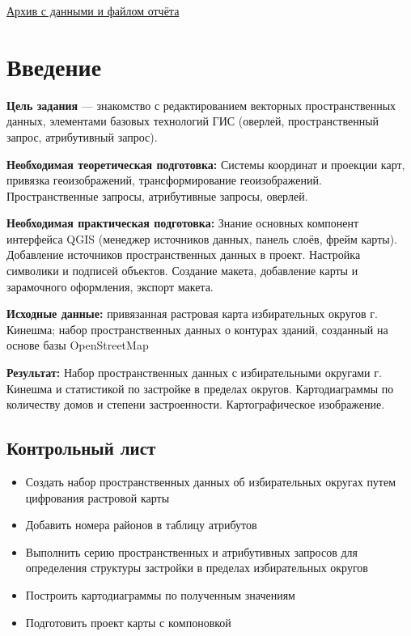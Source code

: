 \documentclass[
  12pt,
]{book}
\providecommand{\tightlist}{%
  \setlength{\itemsep}{0pt}\setlength{\parskip}{0pt}}
\begin{document}
\href{https://1drv.ms/u/s!AmtmZDq3JgxHgZtz3mcQqknItl3Gyw?e=TR90KB}{Архив с данными и файлом отчёта}

\hypertarget{digitizing-intro}{%
\section{Введение}\label{digitizing-intro}}

\textbf{Цель задания} --- знакомство с редактированием векторных пространственных данных, элементами базовых технологий ГИС (оверлей, пространственный запрос, атрибутивный запрос).

\textbf{Необходимая теоретическая подготовка:} Системы координат и проекции карт, привязка геоизображений, трансформирование геоизображений. Пространственные запросы, атрибутивные запросы, оверлей.

\textbf{Необходимая практическая подготовка:} Знание основных компонент интерфейса QGIS (менеджер источников данных, панель слоёв, фрейм карты). Добавление источников пространственных данных в проект. Настройка символики и подписей объектов. Создание макета, добавление карты и зарамочного оформления, экспорт макета.

\textbf{Исходные данные:} привязанная растровая карта избирательных округов г. Кинешма; набор пространственных данных о контурах зданий, созданный на основе базы OpenStreetMap

\textbf{Результат:} Набор пространственных данных с избирательными округами г. Кинешма и статистикой по застройке в пределах округов. Картодиаграммы по количеству домов и степени застроенности. Картографическое изображение.

\hypertarget{digitizing-control}{%
\subsection{Контрольный лист}\label{digitizing-control}}

\begin{itemize}
\tightlist
\item
  Создать набор пространственных данных об избирательных округах путем цифрования растровой карты
\item
  Добавить номера районов в таблицу атрибутов
\item
  Выполнить серию пространственных и атрибутивных запросов для определения структуры застройки в пределах избирательных округов
\item
  Построить картодиаграммы по полученным значениям
\item
  Подготовить проект карты с компоновкой
\end{itemize}
\end{document}

